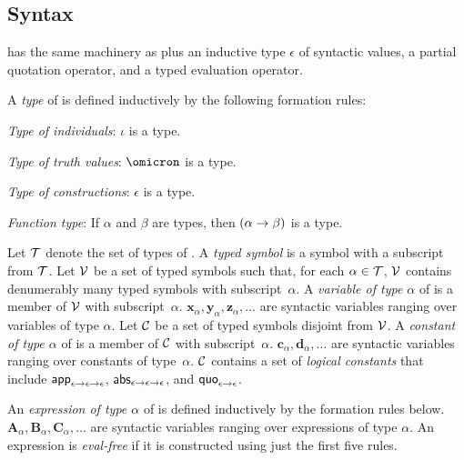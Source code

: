 \documentclass[fleqn]{llncs}
\begin{document}
\subsection{Syntax}

{\churchqe} has the same machinery as {\qzero} plus an
inductive type $\epsilon$ of syntactic values, a partial quotation
operator, and a typed evaluation operator.

A \emph{type} of {\churchqe} is defined inductively by the following
formation rules:
%
\be

  \item \emph{Type of individuals}: $\iota$ is a type.

  \item \emph{Type of truth values}: $\omicron$ is a type.

  \item \emph{Type of constructions}: $\epsilon$ is a type.

  \item \emph{Function type}: If $\alpha$ and $\beta$ are types, then
    $(\alpha \rightarrow \beta)$ is a type.

\ee

\noindent
Let $\mbox{$\cal T$}$ denote the set of types of {\churchqe}.  
A \emph{typed symbol} is a symbol with a subscript from $\mbox{$\cal T$}$.  Let
$\mbox{$\cal V$}$ be a set of typed symbols such that, for each $\alpha \in \mbox{$\cal T$}$,
$\mbox{$\cal V$}$ contains denumerably many typed symbols with subscript~$\alpha$.
A \emph{variable of type $\alpha$} of {\churchqe} is a member of $\mbox{$\cal V$}$
with subscript~$\alpha$.  $\textbf{x}_\alpha, \textbf{y}_\alpha,
\textbf{z}_\alpha, \ldots$ are syntactic variables ranging over
variables of type $\alpha$. Let $\mbox{$\cal C$}$ be a set of typed symbols
disjoint from $\mbox{$\cal V$}$.  A \emph{constant of type $\alpha$} of
{\churchqe} is a member of $\mbox{$\cal C$}$ with subscript~$\alpha$.
$\textbf{c}_\alpha, \textbf{d}_\alpha, \ldots$ are syntactic variables
ranging over constants of type~$\alpha$.  $\mbox{$\cal C$}$ contains a set of
\emph{logical constants} that include $\mbox{\sf app}_{\epsilon \rightarrow
  \epsilon \rightarrow \epsilon}$, $\mbox{\sf abs}_{\epsilon \rightarrow \epsilon
  \rightarrow \epsilon}$, and $\mbox{\sf quo}_{\epsilon \rightarrow \epsilon}$.

An \emph{expression of type $\alpha$} of {\churchqe} is defined
inductively by the formation rules below.  $\textbf{A}_\alpha,
\textbf{B}_\alpha, \textbf{C}_\alpha, \ldots$ are syntactic variables
ranging over expressions of type $\alpha$.  An expression is
\emph{eval-free} if it is constructed using just the first five
rules.
%
\be
\end{document}
